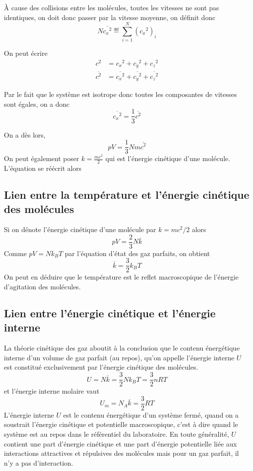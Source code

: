 À cause des collisions entre les molécules,
toutes les vitesses ne sont pas identiques,
on doit donc passer par la vitesse moyenne, on définit donc
\[ N \overline{{c_x}^2} \eqdef \sum_{i=1}^{N}{({c_x}^2)_i} \]

On peut écrire
\begin{align*}
  c^2 & = {c_x}^2 + {c_y}^2 + {c_z}^2\\
  \overline{c^2} & =
  \overline{{c_x}^2} + \overline{{c_y}^2} + \overline{{c_z}^2}
\end{align*}

Par le fait que le système est isotrope donc
toutes les composantes de vitesses sont égales, on a donc
\[  \overline{{c_x}^2} = \frac{1}{3}\overline{c^2} \]

On a dès lors,
\[ pV = \frac{1}{3}Nm\overline{c^2} \]
On peut également poser
$k = \frac{mc^2}{2}$ qui est l'énergie cinétique d'une molécule.
L'équation se réécrit alors


\subsection{Lien entre la température et l'énergie cinétique des molécules}
Si on dénote l'énergie cinétique d'une molécule par $k = mc^2/2$ alors
\[ pV = \frac 23 N\bar k \]
Comme $pV = Nk_BT$ par l'équation d'état des gaz parfaits, on obtient
\[ \bar k = \frac 32 k_B T \]
On peut en déduire que le température est
le reflet macroscopique de l'énergie d'agitation des molécules.

\subsection{Lien entre l'énergie cinétique et l'énergie interne}
La théorie cinétique des gaz aboutit à la conclusion que
le contenu énergétique interne d'un volume de gaz parfait (au repos),
qu'on appelle l'énergie interne $U$ est constitué exclusivement
par l'énergie cinétique des molécules.
\[ U = N\bar k = \frac 32 Nk_BT = \frac 32nRT \]
et l'énergie interne molaire vaut
\[ U_m = N_A\bar k = \frac 32 RT \]
L'énergie interne $U$ est le contenu énergétique d'un système fermé,
quand on a soustrait l'énergie cinétique et potentielle macroscopique,
c'est à dire quand le système est au repos dans le référentiel du laboratoire.
En toute généralité, $U$ contient une part d'énergie cinétique et
une part d'énergie potentielle liée aux interactions attractives et
répulsives des molécules mais pour un gaz parfait, il n'y a pas d'interaction.

